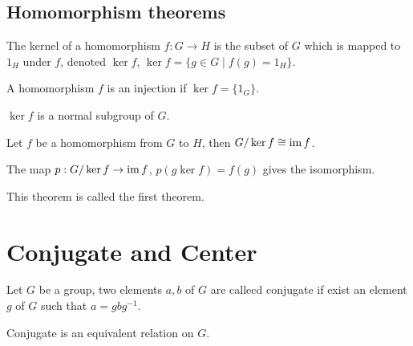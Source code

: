 \subsection{Homomorphism theorems}
\begin{defi}[kernal]
The kernel of a homomorphism $f : G \to H$ is the subset of $G$ which is mapped to $1_H$ under $f$, denoted $\ker f$, $\ker f=\{g \in G \mid f(g)= 1_H\}$.
\end{defi}
\begin{pro}
A homomorphism $f$ is an injection if $\ker f = \{1_G\}$.
\end{pro}
\begin{lem}
$\ker f$ is a normal subgroup of $G$.
\end{lem}
\begin{thm}
Let $f$ be a homomorphism from $G$ to $H$, then $G / \ker f \cong \mathop{\mathrm{im}} f$.
\end{thm}
\begin{prf}
The map $p: G / \ker f \to \mathop{\mathrm{im}} f$, $p(g\ker f) = f(g)$ gives the isomorphism.
\end{prf}
This theorem is called the first theorem.


\section{Conjugate and Center}
\begin{defi}
Let $G$ be a group, two elements $a, b$ of $G$ are callecd conjugate if
exist an element $g$ of $G$ such that $a = gbg^{-1}$.
\end{defi}
Conjugate is an equivalent relation on $G$.


